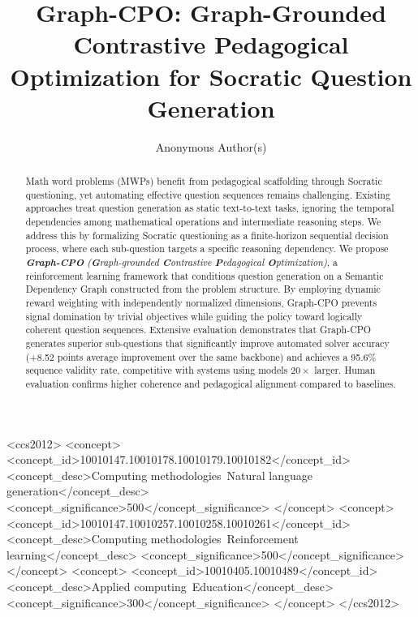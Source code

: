 \documentclass[sigconf, anonymous, review, screen]{acmart}
\begin{document}
\title{Graph-CPO: Graph-Grounded Contrastive Pedagogical Optimization for Socratic Question Generation}

\author{Anonymous Author(s)}
\renewcommand{\shortauthors}{Anonymous Author(s)}

\begin{abstract}

Math word problems (MWPs) benefit from pedagogical scaffolding through Socratic questioning, yet automating effective question sequences remains challenging. Existing approaches treat question generation as static text-to-text tasks, ignoring the temporal dependencies among mathematical operations and intermediate reasoning steps. We address this by formalizing Socratic questioning as a finite-horizon sequential decision process, where each sub-question targets a specific reasoning dependency.
We propose \textit{\textbf{Graph-CPO} (\textbf{G}raph-grounded \textbf{C}ontrastive \textbf{P}edagogical \textbf{O}p\-timization)}, a reinforcement learning framework that conditions question generation on a Semantic Dependency Graph constructed from the problem structure. By employing dynamic reward weighting with independently normalized dimensions, Graph-CPO prevents signal domination by trivial objectives while guiding the policy toward logically coherent question sequences.
Extensive evaluation demonstrates that Graph-CPO generates superior sub-questions that significantly improve automated solver accuracy (+8.52 points average improvement over the same backbone) and achieves a 95.6\% sequence validity rate, competitive with systems using models $20\times$ larger. Human evaluation confirms higher coherence and pedagogical alignment compared to baselines.

\end{abstract}

\begin{CCSXML}
<ccs2012>
   <concept>
       <concept_id>10010147.10010178.10010179.10010182</concept_id>
       <concept_desc>Computing methodologies~Natural language generation</concept_desc>
       <concept_significance>500</concept_significance>
       </concept>
   <concept>
       <concept_id>10010147.10010257.10010258.10010261</concept_id>
       <concept_desc>Computing methodologies~Reinforcement learning</concept_desc>
       <concept_significance>500</concept_significance>
       </concept>
   <concept>
       <concept_id>10010405.10010489</concept_id>
       <concept_desc>Applied computing~Education</concept_desc>
       <concept_significance>300</concept_significance>
       </concept>
 </ccs2012>
\end{CCSXML}
\end{document}
